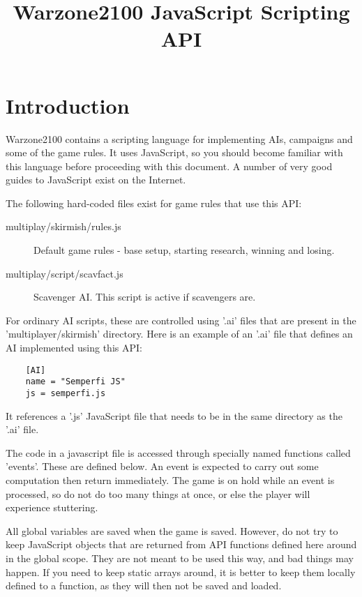 \documentclass[12pt]{article}
\title{Warzone2100 JavaScript Scripting API}
\date{}
\begin{document}
\maketitle

\section{Introduction}

Warzone2100 contains a scripting language for implementing AIs, campaigns and some of the game
rules. It uses JavaScript, so you should become familiar with this language before proceeding
with this document. A number of very good guides to JavaScript exist on the Internet.

The following hard-coded files exist for game rules that use this API:

\begin{description}
	\item[multiplay/skirmish/rules.js] Default game rules - base setup, starting research, winning and losing.
	\item[multiplay/script/scavfact.js] Scavenger AI. This script is active if scavengers are.
\end{description}

For ordinary AI scripts, these are controlled using '.ai' files that are present in the 'multiplayer/skirmish'
directory. Here is an example of an '.ai' file that defines an AI implemented using this API:

\begin{lstlisting}
	[AI]
	name = "Semperfi JS"
	js = semperfi.js
\end{lstlisting}

It references a '.js' JavaScript file that needs to be in the same directory as the '.ai' file. 

The code in a javascript file is accessed through specially named functions called 'events'. These are defined below. 
An event is expected to carry out some computation then return immediately. The game is on hold while an event is 
processed, so do not do too many things at once, or else the player will experience stuttering.

All global variables are saved when the game is saved. However, do not try to keep JavaScript objects that are
returned from API functions defined here around in the global scope. They are not meant to be used this way, and
bad things may happen. If you need to keep static arrays around, it is better to keep them locally defined to a
function, as they will then not be saved and loaded.
\end{document}
